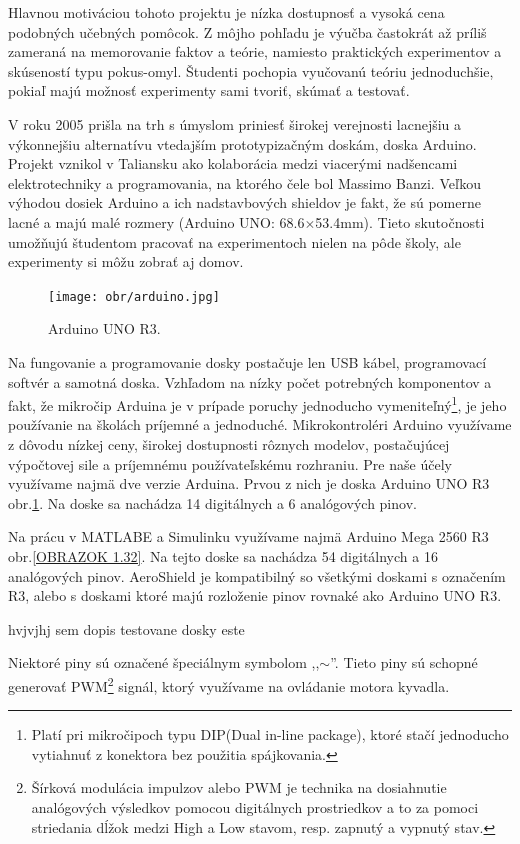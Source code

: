 \newpage
Hlavnou motiváciou tohoto projektu je nízka dostupnosť a vysoká cena podobných učebných pomôcok. Z môjho pohľadu je výučba častokrát až príliš zameraná na memorovanie faktov a teórie, namiesto praktických experimentov a skúseností typu pokus-omyl. Študenti pochopia vyučovanú teóriu jednoduchšie, pokiaľ majú možnosť experimenty sami tvoriť, skúmať a testovať\cite{Dhanapal2013ASO}. 

V roku 2005 prišla na trh s úmyslom priniesť širokej verejnosti lacnejšiu a výkonnejšiu alternatívu vtedajším prototypizačným doskám\cite{stamp}, doska Arduino. Projekt vznikol v Taliansku ako kolaborácia medzi viacerými nadšencami elektrotechniky a programovania, na ktorého čele bol Massimo Banzi. Veľkou výhodou dosiek Arduino a ich nadstavbových shieldov je fakt, že sú pomerne lacné a majú malé rozmery (Arduino UNO: 68.6$\times$53.4mm\cite{UNO}). Tieto skutočnosti umožňujú študentom pracovať na experimentoch nielen na pôde školy, ale experimenty si môžu zobrať aj domov. 

\begin{figure}[!tbh]
	\centering
	\texttt{[image: obr/arduino.jpg]}
	\caption{{Arduino UNO R3.\cite{UNOFOTO}}}\label{OBRAZOK 1.3}
\end{figure}

Na fungovanie a programovanie dosky postačuje len USB kábel, programovací softvér a samotná doska. Vzhľadom na nízky počet potrebných komponentov a fakt, že mikročip Arduina je v prípade poruchy jednoducho vymeniteľný\footnote[2]{Platí pri mikročipoch typu DIP(Dual in-line package), ktoré stačí jednoducho vytiahnuť z konektora bez použitia spájkovania.}, je jeho používanie na školách príjemné a jednoduché. Mikrokontroléri Arduino využívame z dôvodu nízkej ceny, širokej dostupnosti rôznych modelov, postačujúcej výpočtovej sile a príjemnému používateľskému rozhraniu. Pre naše účely využívame najmä dve verzie Arduina. Prvou z nich je doska Arduino UNO R3  obr.\ref{OBRAZOK 1.3}. Na doske sa nachádza 14 digitálnych a 6 analógových pinov.

Na prácu v MATLABE a Simulinku využívame najmä Arduino Mega 2560 R3 obr.\ref{OBRAZOK 1.32}. Na tejto doske sa nachádza 54 digitálnych a 16 analógových pinov. AeroShield je kompatibilný so všetkými doskami s označením R3, alebo s doskami ktoré majú rozloženie pinov rovnaké ako Arduino UNO R3. 



hvjvjhj         sem dopis testovane dosky este 

Niektoré piny sú označené špeciálnym symbolom ,,$\sim$''. Tieto piny sú schopné generovať PWM\footnote[3]{Šírková modulácia impulzov alebo PWM je technika na dosiahnutie analógových výsledkov pomocou digitálnych prostriedkov a to za pomoci striedania dĺžok medzi High a Low stavom, resp. zapnutý a vypnutý stav.} signál, ktorý využívame na ovládanie motora kyvadla.

